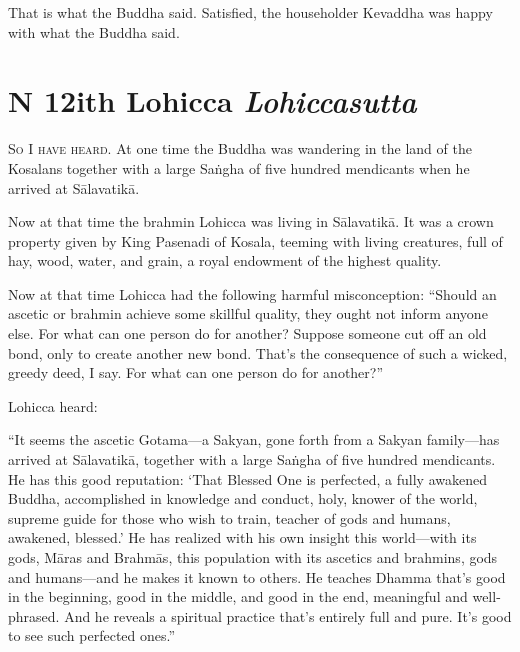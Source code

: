 \documentclass[12pt,openany]{book}%
\newcommand*{\suttatitleacronym}[1]{\smaller[2]{#1}\vspace*{.3em}}
\newcommand*{\suttatitletranslation}[1]{\linebreak{#1}}
\newcommand*{\suttatitleroot}[1]{\linebreak\smaller[2]\itshape{#1}}
\newcommand*{\tocacronym}[1]{\hspace*{-3.3em}{#1}\quad}
\newcommand*{\toctranslation}[1]{#1}
\newcommand*{\tocroot}[1]{(\textit{#1})}
\newcommand*{\scevam}[1]{\textsc{#1}}
\begin{document}
That is what the Buddha said. Satisfied, the householder Kevaddha was happy with what the Buddha said. 

%
\chapter*{{\suttatitleacronym DN 12}{\suttatitletranslation With Lohicca }{\suttatitleroot Lohiccasutta}}
\addcontentsline{toc}{chapter}{\tocacronym{DN 12} \toctranslation{With Lohicca } \tocroot{Lohiccasutta}}

\scevam{So I have heard. }At one time the Buddha was wandering in the land of the Kosalans together with a large \textsanskrit{Saṅgha} of five hundred mendicants when he arrived at \textsanskrit{Sālavatikā}. 

Now at that time the brahmin Lohicca was living in \textsanskrit{Sālavatikā}. It was a crown property given by King Pasenadi of Kosala, teeming with living creatures, full of hay, wood, water, and grain, a royal endowment of the highest quality. 

Now at that time Lohicca had the following harmful misconception: “Should an ascetic or brahmin achieve some skillful quality, they ought not inform anyone else. For what can one person do for another? Suppose someone cut off an old bond, only to create another new bond. That’s the consequence of such a wicked, greedy deed, I say. For what can one person do for another?” 

Lohicca heard: 

“It seems the ascetic Gotama—a Sakyan, gone forth from a Sakyan family—has arrived at \textsanskrit{Sālavatikā}, together with a large \textsanskrit{Saṅgha} of five hundred mendicants. He has this good reputation: ‘That Blessed One is perfected, a fully awakened Buddha, accomplished in knowledge and conduct, holy, knower of the world, supreme guide for those who wish to train, teacher of gods and humans, awakened, blessed.’ He has realized with his own insight this world—with its gods, \textsanskrit{Māras} and \textsanskrit{Brahmās}, this population with its ascetics and brahmins, gods and humans—and he makes it known to others. He teaches Dhamma that’s good in the beginning, good in the middle, and good in the end, meaningful and well-phrased. And he reveals a spiritual practice that’s entirely full and pure. It’s good to see such perfected ones.” 
\end{document}
